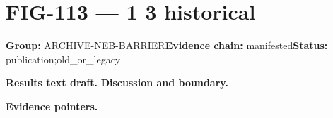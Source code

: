 \clearpage
\section{FIG-113 --- 1 3 historical}
\label{figpage:fig-113}
\textbf{Group:} ARCHIVE-NEB-BARRIER\quad \textbf{Evidence chain:} manifested\quad \textbf{Status:} publication;old\_or\_legacy

\textbf{Results text draft.} 
\textbf{Discussion and boundary.} 


\textbf{Evidence pointers.}



\vfill
